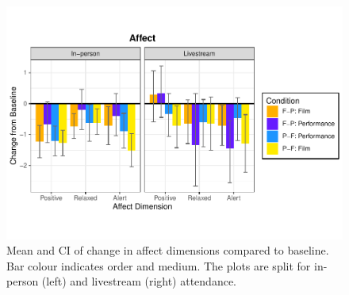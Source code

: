 \documentclass[
  man,floatsintext]{apa6}
\begin{document}
\begin{figure}
\includegraphics[width=1\linewidth]{Schlichting_MSc_Thesis_files/figure-latex/affect-changeplots-1} \caption{Mean and CI of change in affect dimensions compared to baseline. Bar colour indicates order and medium. The plots are split for in-person (left) and livestream (right) attendance.}\label{fig:affect-changeplots}
\end{figure}
\end{document}
